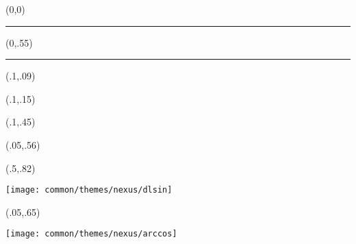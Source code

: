 
\pagestyle{empty}

\begin{textblock}{1}(0,0)
    \noindent\textcolor{plop}{\rule{\paperwidth}{.55\paperheight}}
\end{textblock}


\begin{textblock}{1}(0,.55)
    \noindent\textcolor{black}{\rule{\paperwidth}{.45\paperheight}}
\end{textblock}


\begin{textblock}{1}(.1,.09)
    \noindent{\fontsize{24.88}{2}\selectfont
        \bfseries\textcolor{white}{Nexus.sty}}
\end{textblock}

\begin{textblock}{1}(.1,.15)
    \noindent {\fontsize{24.88}{2}\selectfont
    \bfseries\textcolor{white}{A style file for \LaTeX}}
\end{textblock}


\begin{textblock}{1}(.1,.45)
    \noindent {\fontsize{20.74}{2}\selectfont
        \bfseries\textcolor{white}{Alexis Flesch}}
\end{textblock}



\begin{textblock}{.9}(.05,.56)
    \begin{flushright}
        \noindent {\fontsize{20.74}{2}\selectfont
            \bfseries\textcolor{orange}{version 1.1}}
    \end{flushright}
\end{textblock}


\begin{textblock}{.45}(.5,.82)
    \begin{center}
        \texttt{[image: common/themes/nexus/dlsin]}
    \end{center}
\end{textblock}

\begin{textblock}{.4}(.05,.65)
    \begin{center}
        \texttt{[image: common/themes/nexus/arccos]}
    \end{center}
\end{textblock}



